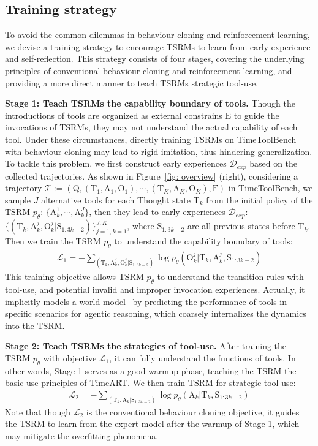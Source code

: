 \subsection{Training strategy}
\label{sec: training strategy}
To avoid the common dilemmas in behaviour cloning and reinforcement learning, we devise a training strategy to encourage TSRMs to learn from early experience and self-reflection. This strategy consists of four stages, covering the underlying principles of conventional behaviour cloning and reinforcement learning, and providing a more direct manner to teach TSRMs strategic tool-use. 

\textbf{Stage 1: Teach TSRMs the capability boundary of tools.} Though the introductions of tools are organized as external constrains $\mathrm{E}$ to guide the invocations of TSRMs, they may not understand the actual capability of each tool. Under these circumstances, directly training TSRMs on TimeToolBench with behaviour cloning may lead to rigid imitation, thus hindering generalization. To tackle this problem, we first construct early experiences $\mathcal{D}_{exp}$ based on the collected trajectories. As shown in Figure~\ref{fig: overview} (right), considering a trajectory $\mathcal{T} := (\mathrm{Q}, (\mathrm{T}_1, \mathrm{A}_1, \mathrm{O}_1),\cdots,(\mathrm{T}_K, \mathrm{A}_K, \mathrm{O}_K), \mathrm{F})$ in TimeToolBench, we sample $J$ alternative tools for each Thought state $\mathrm{T}_k$ from the initial policy of the TSRM $p_\theta$: $\{\mathrm{A}_k^1, \cdots, \mathrm{A}_k^J\}$, then they lead to early experiences $\mathcal{D}_{exp}$: $\{(\mathrm{T}_k, \mathrm{A}_k^j, \mathrm{O}_k^j | \mathrm{S}_{1:3k-2})\}_{j=1,k=1}^{J,K}$, where $\mathrm{S}_{1:3k-2}$ are all previous states before $\mathrm{T}_k$. Then we train the TSRM $p_\theta$ to understand the capability boundary of tools:
\begin{gather}
    \mathcal{L}_1 = -\displaystyle\sum_{(\mathrm{T}_k, \mathrm{A}_k^j, \mathrm{O}_k^j | \mathrm{S}_{1:3k-2})}  \log p_\theta (\mathrm{O}_k^j | \mathrm{T}_k, \mathrm{A}_k^j, \mathrm{S}_{1:3k-2})
\end{gather}
This training objective allows TSRM $p_\theta$ to understand the transition rules with tool-use, and potential invalid and improper invocation experiences. Actually, it implicitly models a world model~\citep{gu2024your} by predicting the performance of tools in specific scenarios for agentic reasoning, which coarsely internalizes the dynamics into the TSRM.

\textbf{Stage 2: Teach TSRMs the strategies of tool-use.} After training the TSRM $p_\theta$ with objective $\mathcal{L}_1$, it can fully understand the functions of tools. In other words, Stage 1 serves as a good warmup phase, teaching the TSRM the basic use principles of TimeART. We then train TSRM for strategic tool-use:
\begin{gather}
    \mathcal{L}_2 = -\displaystyle\sum_{(\mathrm{T}_k,\mathrm{A}_k | \mathrm{S}_{1:3k-2})} \log p_\theta (\mathrm{A}_k | \mathrm{T}_k, \mathrm{S}_{1:3k-2})
\end{gather}
Note that though $\mathcal{L}_2$ is the conventional behaviour cloning objective, it guides the TSRM to learn from the expert model after the warmup of Stage 1, which may mitigate the overfitting phenomena.

